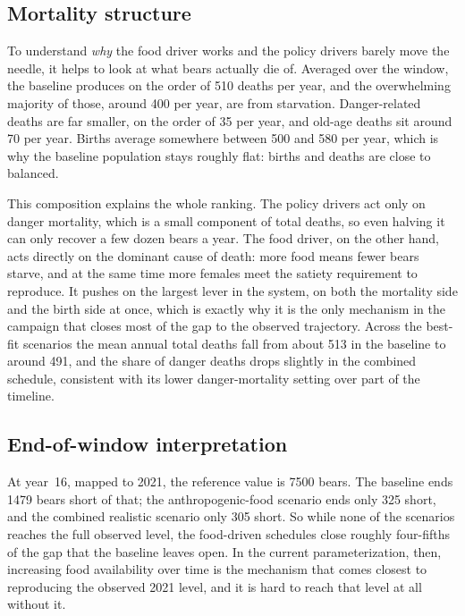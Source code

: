 \subsection{Mortality structure}

To understand \emph{why} the food driver works and the policy drivers barely move the needle, it helps to look at what bears actually die of. Averaged over the window, the baseline produces on the order of 510 deaths per year, and the overwhelming majority of those, around 400 per year, are from starvation. Danger-related deaths are far smaller, on the order of 35 per year, and old-age deaths sit around 70 per year. Births average somewhere between 500 and 580 per year, which is why the baseline population stays roughly flat: births and deaths are close to balanced.

This composition explains the whole ranking. The policy drivers act only on danger mortality, which is a small component of total deaths, so even halving it can only recover a few dozen bears a year. The food driver, on the other hand, acts directly on the dominant cause of death: more food means fewer bears starve, and at the same time more females meet the satiety requirement to reproduce. It pushes on the largest lever in the system, on both the mortality side and the birth side at once, which is exactly why it is the only mechanism in the campaign that closes most of the gap to the observed trajectory. Across the best-fit scenarios the mean annual total deaths fall from about 513 in the baseline to around 491, and the share of danger deaths drops slightly in the combined schedule, consistent with its lower danger-mortality setting over part of the timeline.

\subsection{End-of-window interpretation}

At year~16, mapped to 2021, the reference value is 7500 bears. The baseline ends 1479 bears short of that; the anthropogenic-food scenario ends only 325 short, and the combined realistic scenario only 305 short. So while none of the scenarios reaches the full observed level, the food-driven schedules close roughly four-fifths of the gap that the baseline leaves open. In the current parameterization, then, increasing food availability over time is the mechanism that comes closest to reproducing the observed 2021 level, and it is hard to reach that level at all without it.

